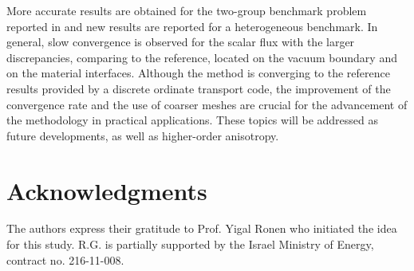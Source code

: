 
More accurate results are obtained for the two-group benchmark problem reported in \cite{Tomatis-2011} and new results are reported for a heterogeneous benchmark. In general, slow convergence is observed for the scalar flux with the larger discrepancies, comparing to the reference, located on the vacuum boundary and on the material interfaces. Although the method is converging to the reference results provided by a discrete ordinate transport code, the improvement of the convergence rate and the use of coarser meshes are crucial for the advancement of the methodology in practical applications. These topics will be addressed as future developments, as well as higher-order anisotropy.

%
\section*{Acknowledgments}
\label{sec:acknow}
The authors express their gratitude to Prof. Yigal Ronen who initiated the idea for this study. R.G. is partially supported by the Israel Ministry of Energy, contract no. 216-11-008. 


	

%







